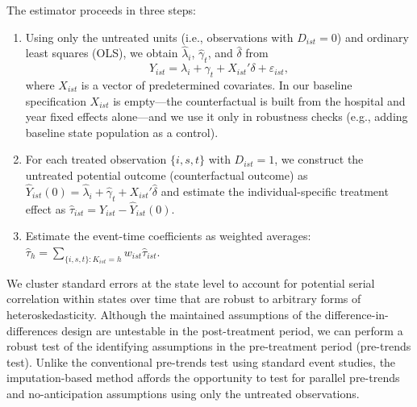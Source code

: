 The estimator proceeds in three steps:	
\begin{enumerate}
\item Using only the untreated units (i.e., observations with $D_{ist} = 0$) and ordinary least squares (OLS), we obtain $\hat{\lambda}_i$, $\hat{\gamma}_t$, and $\hat{\delta}$ from 
\begin{equation*}\label{staggeredmodel-untreated}
		Y_{ist} = \lambda_i  + \gamma_t + X_{ist}'\delta + \varepsilon_{ist},
\end{equation*}
where $X_{ist}$ is a vector of predetermined covariates. In our baseline
specification $X_{ist}$ is empty---the counterfactual is built from the hospital and
year fixed effects alone---and we use it only in robustness checks (e.g., adding
baseline state population as a control).
		
\item For each treated observation $\{i,s,t\}$ with $D_{ist} = 1$, we construct the untreated potential outcome (counterfactual outcome) as $\hat{Y}_{ist}(0) = \hat{\lambda}_i + \hat{\gamma}_t + X_{ist}'\hat{\delta}$ and estimate the individual-specific treatment effect as $\hat{\tau}_{ist} = Y_{ist} - \hat{Y}_{ist}(0)$.
		
\item Estimate the event-time coefficients as weighted averages: $\displaystyle \hat{\tau}_h = \sum_{\{i,s,t\}: K_{ist}=h} w_{ist} \hat{\tau}_{ist}$. 
 
\end{enumerate}
 
 
We cluster standard errors at the state level to account for potential serial correlation within states over time that are robust to arbitrary forms of heteroskedasticity. Although the maintained assumptions of the difference-in-differences design are untestable in the post-treatment period, we can perform a robust test of the identifying assumptions in the pre-treatment period (pre-trends test). Unlike the conventional pre-trends test using standard event studies, the imputation-based method affords the opportunity to test for parallel pre-trends and no-anticipation assumptions using only the untreated observations. 
 
